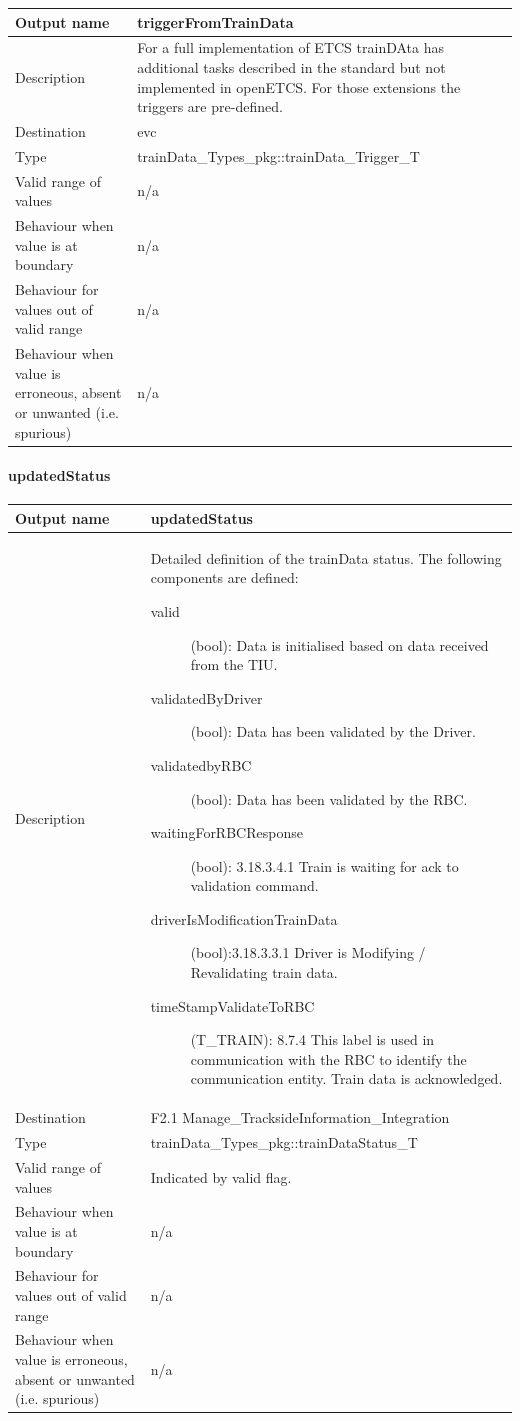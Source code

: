 \begin{longtable}{p{}p{}}
\toprule
Output name				& triggerFromTrainData \\
\midrule
Description				& For a full implementation of ETCS trainDAta has additional tasks described in the standard but not implemented in openETCS. For those extensions the triggers are pre-defined. \\
\midrule
Destination				& evc \\ 
\midrule
Type					& trainData\_Types\_pkg::trainData\_Trigger\_T
 \\
\midrule
Valid range of values	& n/a \\
\midrule
Behaviour when value is at boundary	& n/a\\
\midrule
Behaviour for values out of valid range	& n/a \\
\midrule
Behaviour when value is erroneous, absent or unwanted (i.e. spurious) & n/a\\
\bottomrule
\end{longtable}

\paragraph{updatedStatus}

\begin{longtable}{p{}p{}}
\toprule
Output name				& updatedStatus \\
\midrule
Description				& Detailed definition of the trainData status. The following components are defined:
\begin{description}
\item[valid](bool): Data is initialised based on data received from the TIU.
\item[validatedByDriver](bool): Data has been validated by the Driver.
\item[validatedbyRBC](bool): Data has been validated by the RBC.
\item[waitingForRBCResponse](bool): 3.18.3.4.1 Train is waiting for ack to validation command.
\item[driverIsModificationTrainData](bool):3.18.3.3.1 Driver is Modifying / Revalidating train data.
\item[timeStampValidateToRBC](T\_TRAIN): 8.7.4 This label is used in communication with the RBC to identify the communication entity. Train data is acknowledged.
\end{description} 
\\
\midrule
Destination				& F2.1 Manage\_TracksideInformation\_Integration\\  
\midrule
Type					& trainData\_Types\_pkg::trainDataStatus\_T \\
\midrule
Valid range of values	& Indicated by valid flag. \\
\midrule
Behaviour when value is at boundary	& n/a\\
\midrule
Behaviour for values out of valid range	& n/a \\
\midrule
Behaviour when value is erroneous, absent or unwanted (i.e. spurious) & n/a\\
\bottomrule
\end{longtable}



